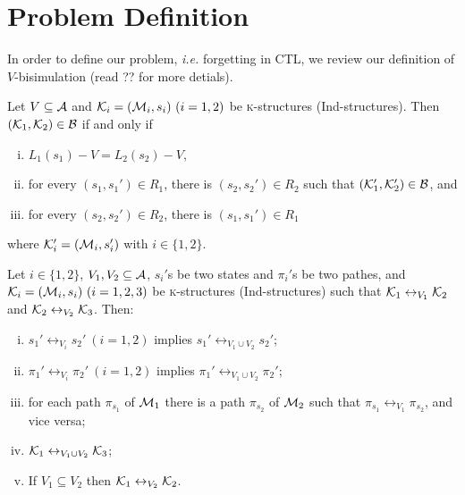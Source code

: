 \documentclass[runningheads]{llncs}
\newcommand\ie{{\it i.e. }}
\newcommand{\lrto}{\leftrightarrow}
\newcommand{\MPK}{\textsc{k}}
\newcommand{\Hm} {{\cal M}}
\newcommand{\Hb} {{\cal B}}
\newcommand{\CTL}{\textrm{CTL}}
\begin{document}
\section{Problem Definition}
In order to define our problem, \ie forgetting in \CTL, we review our definition of $V$-bisimulation (read ?? for more detials).
\begin{definition}\label{def:Vbi}
Let $V\subseteq\cal A$
and ${\cal K}_i=({\cal M}_i,s_i)~(i=1,2)$ be \MPK-structures (Ind-structures).
Then $({\cal K}_1,{\cal K}_2)\in\cal B$ if and only if
  \begin{enumerate}[(i)]
    \item $L_1(s_1)- V = L_2(s_2)-V$,
    \item for every $(s_1,s_1')\in R_1$, there is $(s_2,s_2')\in R_2$
    such that $({\cal K}_1',{\cal K}_2')\in \Hb$, and
    \item for every $(s_2,s_2')\in R_2$, there is $(s_1,s_1')\in R_1$
   \end{enumerate}
 where ${\cal K}_i'=({\cal M}_i,s_i')$ with $i\in\{1,2\}$.
\end{definition}

\begin{proposition}\label{div}
Let $i\in \{1,2\}$, $V_1,V_2\subseteq\cal A$, $s_i'$s be two states and
  $\pi_i'$s be two pathes,
and ${\cal K}_i=({\cal M}_i,s_i)~(i=1,2,3)$ be \MPK-structures (Ind-structures)
 such that
${\cal K}_1\lrto_{V_1}{\cal K}_2$ and ${\cal K}_2\lrto_{V_2}{\cal K}_3$.
 Then:
 \begin{enumerate}[(i)]
   \item $s_1'\lrto_{V_i}s_2'~(i=1,2)$ implies $s_1'\lrto_{V_1\cup V_2}s_2'$;
   \item $\pi_1'\lrto_{V_i}\pi_2'~(i=1,2)$ implies $\pi_1'\lrto_{V_1\cup V_2}\pi_2'$;
   \item for each path $\pi_{s_1}$ of $\Hm_1$ there is a path $\pi_{s_2}$  of $\Hm_2$ such that $\pi_{s_1} \lrto_{V_1} \pi_{s_2}$, and vice versa;
   \item ${\cal K}_1\lrto_{V_1\cup V_2}{\cal K}_3$;
   \item If $V_1 \subseteq V_2$ then ${\cal K}_1 \lrto_{V_2} {\cal K}_2$.
 \end{enumerate}
\end{proposition}
\end{document}
